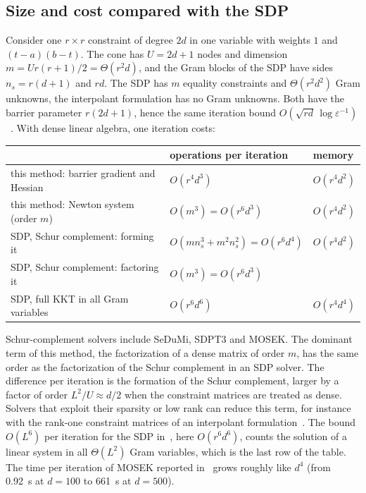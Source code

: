 \documentclass[11pt,a4paper]{article}
\begin{document}
\subsection{Size and cost compared with the SDP}\label{sec:cost}
Consider one $r\times r$ constraint of degree $2d$ in one variable with weights $1$ and $(t-a)(b-t)$. The cone has $U=2d+1$ nodes and dimension $m=Ur(r+1)/2=\Theta(r^2d)$, and the Gram blocks of the SDP have sides $n_s=r(d+1)$ and $rd$. The SDP has $m$ equality constraints and $\Theta(r^2d^2)$ Gram unknowns, the interpolant formulation has no Gram unknowns. Both have the barrier parameter $r(2d+1)$, hence the same iteration bound $O(\sqrt{rd}\,\log\varepsilon^{-1})$~\cite{SkajaaYe2015,PappYildiz2019}. With dense linear algebra, one iteration costs:
\begin{center}\small
\begin{tabular}{lll}
\toprule
& operations per iteration & memory\\
\midrule
this method: barrier gradient and Hessian & $O(r^4d^3)$ & $O(r^4d^2)$\\
this method: Newton system (order $m$) & $O(m^3)=O(r^6d^3)$ & $O(r^4d^2)$\\[2pt]
SDP, Schur complement: forming it & $O(mn_s^3+m^2n_s^2)=O(r^6d^4)$ & $O(r^4d^2)$\\
SDP, Schur complement: factoring it & $O(m^3)=O(r^6d^3)$ & \\[2pt]
SDP, full KKT in all Gram variables & $O(r^6d^6)$ & $O(r^4d^4)$\\
\bottomrule
\end{tabular}
\end{center}
Schur-complement solvers include SeDuMi, SDPT3 and MOSEK. The dominant term of this method, the factorization of a dense matrix of order $m$, has the same order as the factorization of the Schur complement in an SDP solver. The difference per iteration is the formation of the Schur complement, larger by a factor of order $L^2/U\approx d/2$ when the constraint matrices are treated as dense. Solvers that exploit their sparsity or low rank can reduce this term, for instance with the rank-one constraint matrices of an interpolant formulation~\cite{LofbergParrilo2004}. The bound $O(L^6)$ per iteration for the SDP in~\cite[Sec.~1.2]{PappYildiz2019}, here $O(r^6d^6)$, counts the solution of a linear system in all $\Theta(L^2)$ Gram variables, which is the last row of the table. The time per iteration of MOSEK reported in~\cite[Table~1]{PappYildiz2019} grows roughly like $d^4$ (from 0.92~s at $d=100$ to 661~s at $d=500$).
\end{document}
